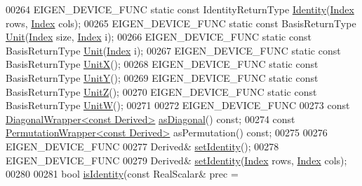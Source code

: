 \begin{DoxyCode}
00264     EIGEN\_DEVICE\_FUNC \textcolor{keyword}{static} \textcolor{keyword}{const} IdentityReturnType \hyperlink{group___core___module_a2ef43190f3aba0aef0cf1030d46d0ca7}{Identity}(\hyperlink{namespace_eigen_a62e77e0933482dafde8fe197d9a2cfde}{Index} rows, 
      \hyperlink{namespace_eigen_a62e77e0933482dafde8fe197d9a2cfde}{Index} cols);
00265     EIGEN\_DEVICE\_FUNC \textcolor{keyword}{static} \textcolor{keyword}{const} BasisReturnType \hyperlink{group___core___module_a1f39dde25807c1f008aa874e690b3fed}{Unit}(\hyperlink{namespace_eigen_a62e77e0933482dafde8fe197d9a2cfde}{Index} size, 
      \hyperlink{namespace_eigen_a62e77e0933482dafde8fe197d9a2cfde}{Index} i);
00266     EIGEN\_DEVICE\_FUNC \textcolor{keyword}{static} \textcolor{keyword}{const} BasisReturnType \hyperlink{group___core___module_a1f39dde25807c1f008aa874e690b3fed}{Unit}(\hyperlink{namespace_eigen_a62e77e0933482dafde8fe197d9a2cfde}{Index} i);
00267     EIGEN\_DEVICE\_FUNC \textcolor{keyword}{static} \textcolor{keyword}{const} BasisReturnType \hyperlink{group___core___module_ac12aa899494685551e11f238836ee600}{UnitX}();
00268     EIGEN\_DEVICE\_FUNC \textcolor{keyword}{static} \textcolor{keyword}{const} BasisReturnType \hyperlink{group___core___module_ab8e21066a2e5cf5ca8bb0383e44a6efa}{UnitY}();
00269     EIGEN\_DEVICE\_FUNC \textcolor{keyword}{static} \textcolor{keyword}{const} BasisReturnType \hyperlink{group___core___module_a122e525a8f5ef3e4d459055615f662de}{UnitZ}();
00270     EIGEN\_DEVICE\_FUNC \textcolor{keyword}{static} \textcolor{keyword}{const} BasisReturnType \hyperlink{group___core___module_ac28c3d440440464b1fc8d9f2a6d5624a}{UnitW}();
00271 
00272     EIGEN\_DEVICE\_FUNC
00273     \textcolor{keyword}{const} \hyperlink{group___core___module_class_eigen_1_1_diagonal_wrapper}{DiagonalWrapper<const Derived>} 
      \hyperlink{group___core___module_a14235b62c90f93fe910070b4743782d0}{asDiagonal}() \textcolor{keyword}{const};
00274     \textcolor{keyword}{const} \hyperlink{group___core___module_class_eigen_1_1_permutation_wrapper}{PermutationWrapper<const Derived>} asPermutation() \textcolor{keyword}{const};
00275 
00276     EIGEN\_DEVICE\_FUNC
00277     Derived& \hyperlink{group___core___module_ae05be7fcc1ade707f0b73eb5f9d8cf33}{setIdentity}();
00278     EIGEN\_DEVICE\_FUNC
00279     Derived& \hyperlink{group___core___module_ae05be7fcc1ade707f0b73eb5f9d8cf33}{setIdentity}(\hyperlink{namespace_eigen_a62e77e0933482dafde8fe197d9a2cfde}{Index} rows, \hyperlink{namespace_eigen_a62e77e0933482dafde8fe197d9a2cfde}{Index} cols);
00280 
00281     \textcolor{keywordtype}{bool} \hyperlink{group___core___module_a4ccbd8dfa06e9d47b9bf84711f8b9d40}{isIdentity}(\textcolor{keyword}{const} RealScalar& prec = 

\end{DoxyCode}

